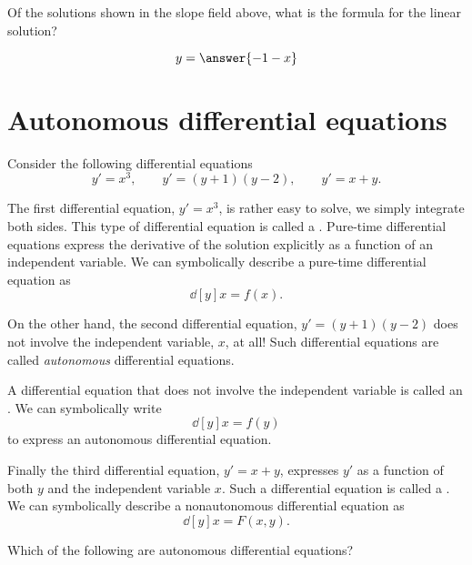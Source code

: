 \documentclass{ximera}
\begin{document}
\begin{question}
  Of the solutions shown in the slope field above, what is the formula
  for the linear solution?
  \begin{prompt}
    \[
    y = \answer{-1-x}
    \]
  \end{prompt}
\end{question}



\section{Autonomous differential equations}


Consider the following differential equations
\[
y' = x^3,\qquad y'=(y+1)(y-2), \qquad y'= x+y.
\]

The first differential equation, $y' = x^3$, is rather easy to solve,
we simply integrate both sides. This type of differential equation is
called a . Pure-time differential
equations express the derivative of the solution explicitly as a
function of an independent variable. We can symbolically describe a
pure-time differential equation as
\[
\dd[y]{x} = f(x).
\]

On the other hand, the second differential equation, $y'=(y+1)(y-2)$
does not involve the independent variable, $x$, at all!  Such
differential equations are called \textit{autonomous} differential
equations.

\begin{definition}
  A differential equation that does not involve the independent
  variable is called an . We can
  symbolically write
  \[
  \dd[y]{x} = f(y)
  \]
  to express an autonomous differential equation.
\end{definition}

Finally the third differential equation, $y'= x+y$, expresses $y'$ as
a function of both $y$ and the independent variable $x$. Such a
differential equation is called a . We can symbolically describe  a nonautonomous differential equation as
\[
\dd[y]{x} = F(x,y).
\]
\begin{question}
  Which of the following are autonomous differential equations?
  \begin{selectAll}
  \end{selectAll}
\end{question}
\end{document}
